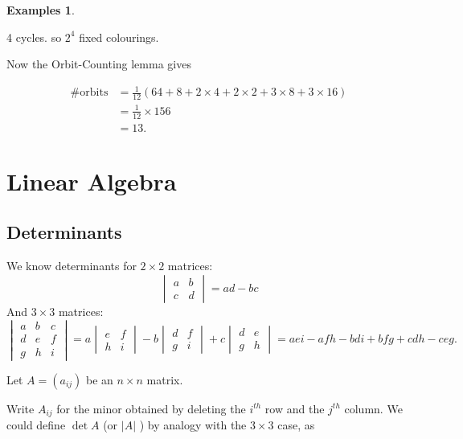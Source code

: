 \documentclass{article}
\theoremstyle{definition}
\newtheorem*{exmps}{Examples}
\begin{document}
\begin{exmps}
\begin{itemize}
\begin{figure}[h]
         \label{fig:necklace1}
       \end{figure}
       

       4 cycles. so $2^4$ fixed colourings.

       
       Now the Orbit-Counting lemma gives

       \begin{align*}
         \# \text{orbits} &= \frac{1}{12}(64 + 8 + 2\times4 + 2\times 2 + 3 \times 8 + 3 \times 16)\\ 
       &= \frac{1}{12}\times 156 \\
       &= 13.
       \end{align*}
  \end{itemize}
\end{exmps}

\section{Linear Algebra}
\subsection{Determinants}
We know determinants for $2 \times 2$ matrices:
\[
  \begin{vmatrix}
    a & b \\
    c & d
  \end{vmatrix} = ad - bc
\]
And $3 \times 3$ matrices: 
\[
  \begin{vmatrix}
    a & b & c \\
    d & e & f \\
    g & h & i
  \end{vmatrix} = 
  a \begin{vmatrix}
    e & f \\
    h & i
  \end{vmatrix} - 
  b\begin{vmatrix}
   d & f \\
   g & i
  \end{vmatrix} +
  c\begin{vmatrix}
    d & e \\
    g & h
  \end{vmatrix} = aei - afh - bdi +bfg +cdh-ceg.
\]

Let $A=(a_{ij})$  be an $n \times n$ matrix.

Write $A_{ij}$ for the minor obtained by deleting the $i^{th}$ row and the $j^{th}$ column. We could define $\det A$ (or $|A|$ ) by analogy with the $3 \times 3$ case, as
\end{document}
